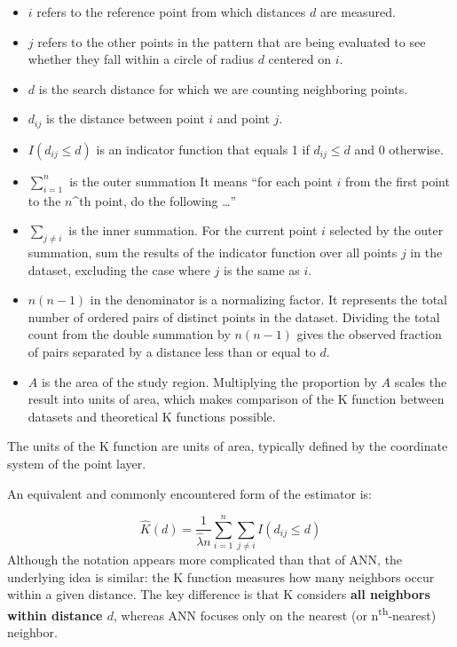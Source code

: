 \documentclass[
  letterpaper,
]{book}
\providecommand{\tightlist}{%
  \setlength{\itemsep}{0pt}\setlength{\parskip}{0pt}}
\begin{document}
\begin{itemize}
\tightlist
\item
  \(i\) refers to the reference point from which distances \(d\) are
  measured.
\item
  \(j\) refers to the other points in the pattern that are being
  evaluated to see whether they fall within a circle of radius \(d\)
  centered on \(i\).
\item
  \(d\) is the search distance for which we are counting neighboring
  points.
\item
  \(d_{ij}\) is the distance between point \(i\) and point \(j\).
\item
  \(I(d_{ij} \le d)\) is an indicator function that equals 1 if
  \(d_{ij} \le d\) and 0 otherwise.
\item
  \(\sum_{i=1}^{n}\) is the outer summation It means ``for each point
  \(i\) from the first point to the \(n\)\^{}th point, do the following
  \ldots{}''
\item
  \(\sum_{j \neq i}\) is the inner summation. For the current point
  \(i\) selected by the outer summation, sum the results of the
  indicator function over all points \(j\) in the dataset, excluding the
  case where \(j\) is the same as \(i\).
\item
  \(n(n-1)\) in the denominator is a normalizing factor. It represents
  the total number of ordered pairs of distinct points in the dataset.
  Dividing the total count from the double summation by \(n(n-1)\) gives
  the observed fraction of pairs separated by a distance less than or
  equal to \(d\).
\item
  \(A\) is the area of the study region. Multiplying the proportion by
  \(A\) scales the result into units of area, which makes comparison of
  the K function between datasets and theoretical K functions possible.
\end{itemize}

The units of the K function are units of area, typically defined by the
coordinate system of the point layer.

An equivalent and commonly encountered form of the estimator is:

\[ \widehat{K}(d) = \frac{1}{\widehat\lambda n} \sum_{i=1}^{n} \sum_{j \neq i} I(d_{ij} \leq d) \]
Although the notation appears more complicated than that of ANN, the
underlying idea is similar: the K function measures how many neighbors
occur within a given distance. The key difference is that K considers
\textbf{all neighbors within distance \(d\)}, whereas ANN focuses only
on the nearest (or n\textsuperscript{th}-nearest) neighbor.
\end{document}
